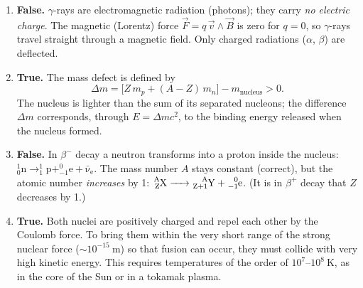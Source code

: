 \documentclass[11pt]{article}
\begin{document}
\begin{corrige}
\begin{enumerate}
    \item \textbf{False.} $\gamma$-rays are electromagnetic radiation (photons); they carry \emph{no electric charge}. The magnetic (Lorentz) force $\vec{F} = q\,\vec{v}\wedge\vec{B}$ is zero for $q = 0$, so $\gamma$-rays travel straight through a magnetic field. Only charged radiations ($\alpha$, $\beta$) are deflected.
    \item \textbf{True.} The mass defect is defined by
    \[\Delta m = \big[Z\,m_p + (A-Z)\,m_n\big] - m_{\text{nucleus}} > 0.\]
    The nucleus is lighter than the sum of its separated nucleons; the difference $\Delta m$ corresponds, through $E = \Delta m c^{2}$, to the binding energy released when the nucleus formed.
    \item \textbf{False.} In $\beta^{-}$ decay a neutron transforms into a proton inside the nucleus: $\ensuremath{\mathrm{^{1}_{0}n \rightarrow  ^{1}_{1}p + ^{0}_{-1}e + \bar{\nu}_e}}$. The mass number $A$ stays constant (correct), but the atomic number \emph{increases} by 1: $\ce{^{A}_{Z}X -> ^{A}_{Z+1}Y + ^{0}_{-1}e}$. (It is in $\beta^{+}$ decay that $Z$ decreases by 1.)
    \item \textbf{True.} Both nuclei are positively charged and repel each other by the Coulomb force. To bring them within the very short range of the strong nuclear force ($\sim 10^{-15}\ \mathrm{m}$) so that fusion can occur, they must collide with very high kinetic energy. This requires temperatures of the order of $10^{7}$--$10^{8}\ \mathrm{K}$, as in the core of the Sun or in a tokamak plasma.
\end{enumerate}
\end{corrige}
\end{document}
